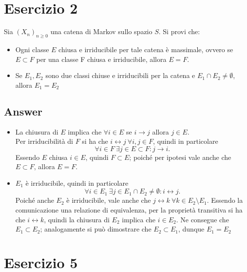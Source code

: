 \documentclass[
	12pt, %
]{fphw}
\begin{document}
\section*{Esercizio 2}
\begin{problem}
	\smallskip
	Sia $(X_n)_{n \ge 0}$ una catena di Markov sullo spazio $S$. Si provi che:\\
	\begin{itemize}
		\item Ogni classe $E$ chiusa e irriducibile per tale catena è massimale, 
		ovvero se $E \subset F$ per una classe F chiusa e irriducibile, allora $E = F$.
		\item Se $E_1, E_2$ sono due classi chiuse e irriducibili per la catena e
		$E_1 \cap E_2 \ne \emptyset$, allora $E_1 = E_2$
	\end{itemize}
	\smallskip
\end{problem}
\subsection*{Answer}
	\begin{itemize}
		\item La chiusura di $E$ implica che $\forall i \in E$ se $i \to j$ allora $j \in E$.\\
		Per irriducibilità di $F$ si ha che $i \leftrightarrow j ~ \forall i,j \in F$, quindi in particolare
		\begin{equation*}
			\forall i \in F ~ \exists j \in E \subset F : j \to i.
		\end{equation*}
		Essendo $E$ chiusa $i \in E$, quindi $F \subset E$;
		poiché per ipotesi vale anche che $E \subset F$, allora $E = F$.
		\item $E_1$ è irriducibile, quindi in particolare
		\begin{equation*}
			\forall i \in E_1 ~ \exists j \in E_1 \cap E_2 \ne \emptyset : i \leftrightarrow j.
		\end{equation*}
		Poiché anche $E_2$ è irriducibile, vale anche che $j \leftrightarrow k ~ \forall k \in E_2 \setminus E_1$.
		Essendo la comunicazione una relazione di equivalenza, per la proprietà transitiva si ha che $i \leftrightarrow k$, quindi la chiusura di $E_2$ implica che $i \in E_2$.
		Ne consegue che $E_1 \subset E_2$; analogamente si può dimostrare che $E_2 \subset E_1$, dunque $E_1 = E_2$
	\end{itemize}

\section*{Esercizio 5}
\end{document}
